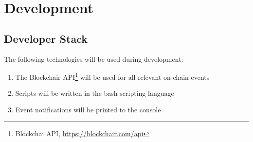 \section{Development}
\subsection{Developer Stack}
The following technologies will be used during development:
\begin{enumerate}[noitemsep]
  \item The Blockchair API\footnote{Blockchai API, \url{https://blockchair.com/api}} will be used for all relevant on-chain events
  \item Scripts will be written in the bash scripting language
  \item Event notifications will be printed to the console
\end{enumerate}


